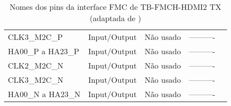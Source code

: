 \begin{table}[h!]
{\begin{tabular}{@{}lllll@{}}
			CLK3\_M2C\_P         & Input/Output          & Não usado              & ----------                     \\ 
			HA00\_P a HA23\_P    & Input/Output          & Não usado              & ----------                     \\ 
			CLK2\_M2C\_N         & Input/Output          & Não usado              & ----------                     \\ 
			CLK3\_M2C\_N         & Input/Output          & Não usado              & ----------                     \\ 
			HA00\_N a HA23\_N    & Input/Output          & Não usado              & ----------                     \\ \bottomrule
		\end{tabular}}
			\caption[Nomes dos pins da interface FMC de TB-FMCH-HDMI2 TX]{Nomes dos pins da interface FMC de TB-FMCH-HDMI2 TX (adaptada de \cite{R009})}
			\label{table:HDMIdataTX}
	\end{table}


